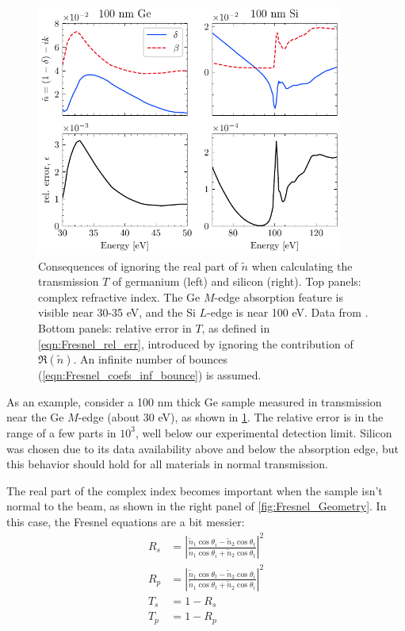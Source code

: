 \begin{figure}
	\centering
	\includegraphics[width=0.9\textwidth]{figures/chap1/Ge_Si_transmission_Fresnel.pdf}
	\caption{Consequences of ignoring the real part of $\tilde{n}$ when calculating the transmission $T$ of germanium (left) and silicon (right). Top panels: complex refractive index. The Ge $M$-edge absorption feature is visible near 30-35 eV, and the Si $L$-edge is near 100 eV. Data from \cite{gulliksonCXROXRayInteractions}. Bottom panels: relative error in $T$, as defined in \cref{eqn:Fresnel_rel_err}, introduced by ignoring the contribution of $\Re(\tilde{n})$. An infinite number of bounces (\cref{eqn:Fresnel_coefs_inf_bounce}) is assumed.}
	\label{fig:Ge_Si_transmission_Fresnel}
\end{figure}

As an example, consider a 100 nm thick Ge sample measured in transmission near the Ge $M$-edge (about 30 eV), as shown in \cref{fig:Ge_Si_transmission_Fresnel}. The relative error is in the range of a few parts in $10^3$, well below our experimental detection limit. Silicon was chosen due to its data availability above and below the absorption edge, but this behavior should hold for all materials in normal transmission.

The real part of the complex index becomes important when the sample isn't normal to the beam, as shown in the right panel of \cref{fig:Fresnel_Geometry}. In this case, the Fresnel equations are a bit messier:
\begin{equation}
	\begin{aligned}
		R_s &= \left| \frac{\tilde{n}_1 \cos \theta_i - \tilde{n}_2 \cos \theta_t}{\tilde{n}_1 \cos \theta_i + \tilde{n}_2 \cos \theta_t}  \right|^2 \\
		R_p &= \left| \frac{\tilde{n}_1 \cos \theta_t - \tilde{n}_2 \cos \theta_i}{\tilde{n}_1 \cos \theta_t + \tilde{n}_2 \cos \theta_i}  \right|^2 \\
		T_s &= 1 - R_s \\
		T_p &= 1 - R_p \\
	\end{aligned}
	\label{eqn:Fresnel_nonnormal}
\end{equation}

